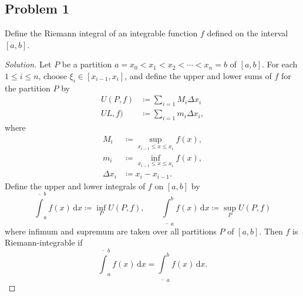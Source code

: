 \documentclass[12pt]{article}
\theoremstyle{definition}
\begin{document}
\subsection{Problem 1 \texorpdfstring{\cite{PZ}}{}}
Define the Riemann integral of an integrable function $f$ defined on the interval $[a,b]$.
\begin{proof}[Solution]
    Let $P$ be a partition $a = x_0 < x_1 < x_2 < \dotsb < x_n = b$ of $[a,b]$. For each $1 \leq i \leq n$, choose $\xi_i \in [x_{i-1},x_i]$, and define the upper and lower sums of $f$ for the partition $P$ by 
    \begin{align*}
        U(P,f) & \coloneqq \sum\limits_{i = 1} M_i \Delta x_i \\
        UL,f) & \coloneqq \sum\limits_{i = 1} m_i \Delta x_i,
    \end{align*}
    where 
    \begin{align*}
        M_i & \coloneqq \sup\limits_{x_{i-1} \leq x \leq x_i } f(x), \\
        m_i & \coloneqq \inf\limits_{x_{i-1} \leq x \leq x_i } f(x), \\
        \Delta x_i & \coloneqq x_i - x_{i-1}.
    \end{align*}
    Define the upper and lower integrals of $f$ on $[a,b]$ by 
    \[
        \overline{\int}_a^b f(x) \, \mathrm{d}x \coloneqq \inf\limits_{P} U(P,f) , \qquad \underline{\int}_a^b f(x) \, \mathrm{d}x \coloneqq \sup\limits_{P} U(P,f)
    \]
    where infimum and supremum are taken over all partitions $P$ of $[a,b]$. Then $f$ is Riemann-integrable if 
    \[
        \overline{\int}_a^b f(x) \, \mathrm{d}x = \underline{\int}_a^b f(x) \, \mathrm{d}x.
    \]
\end{proof}
\end{document}
